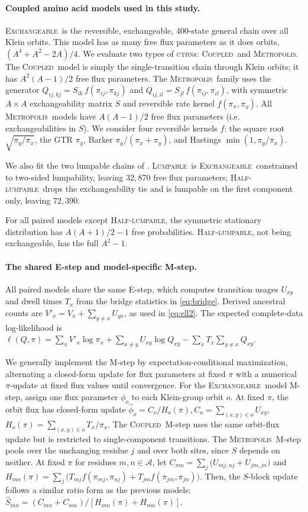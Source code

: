 \documentclass[11pt]{article}
\newcommand{\CTBN}{\textsc{ctbn}}
\newcommand{\Coupledm}{\textsc{Coupled}}
\newcommand{\Exchm}{\textsc{Exchangeable}}
\newcommand{\Metrop}{\textsc{Metropolis}}
\newcommand{\Lumpm}{\textsc{Lumpable}}
\newcommand{\Halflump}{\textsc{Half-lumpable}}
\newcommand{\Xset}{\mathcal{A}}
\begin{document}
\paragraph{Coupled amino acid models used in this study.}  \Exchm\ is the reversible,
exchangeable, 400-state general chain over all Klein orbits. This model has as many free
flux parameters as it does orbits, $(A^4+A^2-2A)/4$.
We evaluate two types of \CTBN s: \Coupledm\ and \Metrop. The \Coupledm\
model is simply the single-transition chain through Klein orbits; it has $A^2(A-1) / 2$
free flux parameters.
The \Metrop\ family uses the generator
$Q_{ij,kj}=S_{ik}\,f(\pi_{ij},\pi_{kj})$ and $Q_{ij,il}=S_{jl}\,f(\pi_{ij},\pi_{il})$, with
symmetric $A\times A$ exchangeability matrix $S$ and reversible rate kernel $f(\pi_x,\pi_y)$.
All \Metrop\ models have $A(A-1) / 2$ free flux parameters (i.e. exchangeabilities in $S$).
We consider four reversible kernels
$f$:  the square root $\sqrt{\pi_y/\pi_x}$, the GTR $\pi_y$, Barker $\pi_y/(\pi_x{+}\pi_y)$, and
Hastings $\min(1,\pi_y/\pi_x)$.

We also fit the two lumpable chains of . \Lumpm\ is \Exchm\ constrained
to two-sided lumpability, leaving $32{,}870$ free flux parameters; \Halflump\ drops the
exchangeability tie and is lumpable on the first component only, leaving $72{,}390$.

For all paired models except \Halflump, the symmetric stationary distribution has
$A(A{+}1)/2-1$ free probabilities. \Halflump, not being exchangeable, has the full
$A^2-1$.

\paragraph{The shared E-step and model-specific M-step.} All paired models share the
same E-step, which computes transition usages $U_{xy}$ and dwell times $T_x$
from the bridge statistics in \eqref{eq:bridge}.
Derived ancestral counts are $V'_x=V_x+\sum_{y\ne x}U_{yx}$, as used in \eqref{eq:ell2}.
The expected complete-data log-likelihood is $\ell(Q, \pi) = \sum_x
V'_x\log\pi_x + \sum_{x\ne y}U_{xy}\log Q_{xy}-\sum_xT_x\!\sum_{y \neq x}Q_{xy}$.

We generally implement the M-step by expectation-conditional maximization, alternating a
closed-form update for flux parameters at fixed $\pi$ with a numerical $\pi$-update at fixed
flux values until convergence.
For the \Exchm\ model M-step, assign one flux parameter $\phi_o$ to each Klein-group orbit $o$.
At fixed $\pi$, the orbit flux has closed-form update
$\widehat\phi_o=C_o/H_o(\pi), C_o=\sum_{(x,y)\in o}U_{xy}$, $H_o(\pi)=\sum_{(x,y)\in o} T_x/\pi_x$.
The \Coupledm\ M-step uses the same orbit-flux update but is restricted to
single-component transitions.
The \Metrop\ M-step pools over the unchanging residue $j$ and over both sites,
since $S$ depends on neither. At fixed $\pi$ for residues $m,n \in \Xset$, let
$C_{mn}=\sum_j\big(U_{mj,nj}+U_{jm,jn}\big)$
and $H_{mn}(\pi)=\sum_j\big(T_{mj}f(\pi_{mj},\pi_{nj})+T_{jm}f(\pi_{jm},\pi_{jn})\big)$.
Then, the $S$-block update follows a similar ratio form as the previous models:
$\widehat S_{mn}=(C_{mn}{+}C_{nm})/[H_{mn}(\pi){+}H_{nm}(\pi)]$.
\end{document}
